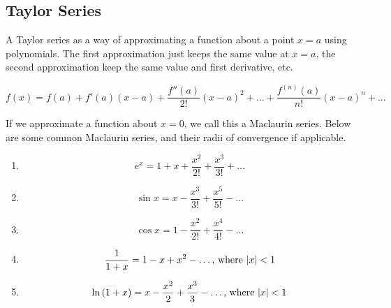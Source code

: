 \subsection{Taylor Series}
\noindent
A Taylor series as a way of approximating a function about a point $x=a$ using polynomials. The first approximation just keeps the same value at $x=a$, the second approximation keep the same value and first derivative, etc.
\begin{definition}
	\begin{equation*}
		f(x) = f(a)+f'(a)(x-a) + \frac{f''(a)}{2!}(x-a)^2 + \ldots +  \frac{f^{(n)}(a)}{n!}(x-a)^n + \ldots
	\end{equation*}
\end{definition}
\noindent
If we approximate a function about $x=0$, we call this a Maclaurin series. Below are some common Maclaurin series, and their radii of convergence if applicable.
\begin{enumerate}[label=]
	\item \begin{equation*}
		e^x = 1 + x + \frac{x^2}{2!} + \frac{x^3}{3!} + \ldots
	\end{equation*}
	\item \begin{equation*}
		\sin{x} = x - \frac{x^3}{3!} + \frac{x^5}{5!} - \ldots
	\end{equation*}
	\item \begin{equation*}
		\cos{x} = 1 - \frac{x^2}{2!} + \frac{x^4}{4!} - \ldots
	\end{equation*}
	\item \begin{equation*}
		\frac{1}{1+x} = 1 - x + x^2 - \ldots \text{, where } \lvert x \rvert < 1
	\end{equation*}
	\item \begin{equation*}
		\ln{(1+x)} = x - \frac{x^2}{2} + \frac{x^3}{3} - \ldots \text{, where } \lvert x \rvert < 1
	\end{equation*}
\end{enumerate}

